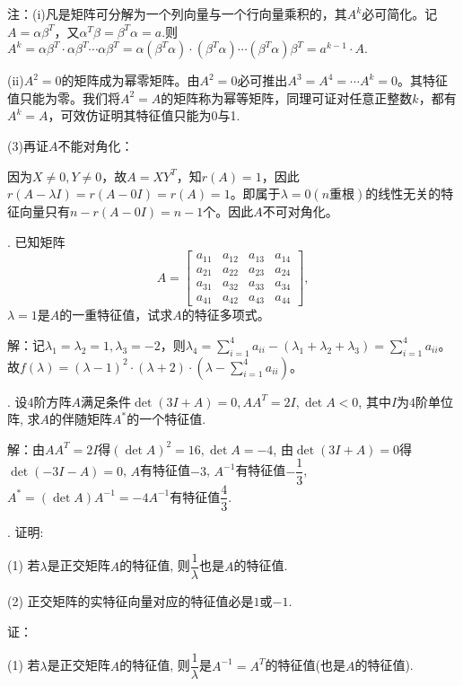 \documentclass[10pt,twocolumn,letterpaper]{article}
\theoremstyle{mythmstyle}
\begin{document}
注：(i)凡是矩阵可分解为一个列向量与一个行向量乘积的，其$A^k$必可简化。记$A=\alpha\beta^T$，又$\alpha^T\beta=\beta^T\alpha=a.$则$A^k=\alpha\beta^T\cdot\alpha\beta^T\cdots\alpha\beta^T=\alpha(\beta^T\alpha)\cdot(\beta^T\alpha)\cdots(\beta^T\alpha)\beta^T=a^{k-1}\cdot A.$

(ii)$A^2=0$的矩阵成为幂零矩阵。由$A^2=0$必可推出$A^3=A^4=\cdots A^k=0$。其特征值只能为零。我们将$A^2=A$的矩阵称为幂等矩阵，同理可证对任意正整数$k$，都有$A^k=A$，可效仿证明其特征值只能为0与1.

(3)再证$A$不能对角化：

因为$X\neq 0,Y\neq 0$，故$A=XY^T$，知$r(A)=1$，因此$r(A-\lambda I)=r(A-0I)=r(A)=1$。即属于$\lambda=0(n\text{重根})$的线性无关的特征向量只有$n-r(A-0I)=n-1$个。因此$A$不可对角化。

\vspace{1em}
. 已知矩阵
$$A=\begin{bmatrix}
a_{11}&a_{12}&a_{13}&a_{14}\\
a_{21}&a_{22}&a_{23}&a_{24}\\
a_{31}&a_{32}&a_{33}&a_{34}\\
a_{41}&a_{42}&a_{43}&a_{44}
\end{bmatrix},$$
$\lambda=1$是$A$的一重特征值，试求$A$的特征多项式。

\noindent 解：记$\lambda_1=\lambda_2=1,\lambda_3=-2$，则$\lambda_4=\sum_{i=1}^4a_{ii}-(\lambda_1+\lambda_2+\lambda_3)=\sum_{i=1}^4a_{ii}$。故$f(\lambda)=(\lambda-1)^2\cdot(\lambda+2)\cdot(\lambda-\sum_{i=1}^4a_{ii})$。


\vspace{1em}
. 设$4$阶方阵$A$满足条件$\det(3I+A)=0,AA^T=2I,\det A<0$, 其中$I$为$4$阶单位阵, 求$A$的伴随矩阵$A^*$的一个特征值.

\noindent 解：由$AA^T=2I$得$(\det A)^2=16,\det A=-4$, 由$\det(3I+A)=0$得$\det(-3I-A)=0$, $A$有特征值$-3$, $A^{-1}$有特征值$-\dfrac{1}{3}$, $A^*=(\det A)A^{-1}=-4A^{-1}$有特征值$\dfrac{4}{3}$.

\vspace{1em}
. 证明:

\noindent (1) 若$\lambda$是正交矩阵$A$的特征值, 则$\dfrac{1}{\lambda}$也是$A$的特征值.

\noindent (2) 正交矩阵的实特征向量对应的特征值必是$1$或$-1$.

\noindent 证：

\noindent (1) 若$\lambda$是正交矩阵$A$的特征值, 则$\dfrac{1}{\lambda}$是$A^{-1}=A^T$的特征值(也是$A$的特征值).
\end{document}
